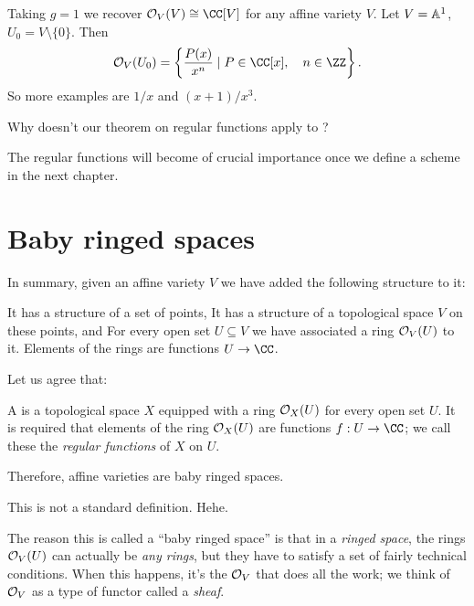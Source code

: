 \documentclass[11pt]{scrreprt}
\begin{document}
\begin{example}
	\listhack
	\begin{enumerate}[(a)]
		\ii Taking $g=1$ we recover $\OO_V(V) \cong \CC[V]$ for any affine variety $V$.
		\ii Let $V = \mathbb A^1$, $U_0 = V \setminus \{0\}$. Then
		\[ \OO_V(U_0)
			= \left\{ \frac{P(x)}{x^n} \mid P \in \CC[x], \quad n \in \ZZ \right\}. \]
		So more examples are $1/x$ and $(x+1)/x^3$.
	\end{enumerate}
\end{example}

\begin{ques}
	Why doesn't our theorem on regular functions apply to ?
\end{ques}

The regular functions will become of crucial importance
once we define a scheme in the next chapter.

\section{Baby ringed spaces}
In summary, given an affine variety $V$ we have
added the following structure to it:
\begin{itemize}
	\ii It has a structure of a set of points,
	\ii It has a structure of a topological space $V$ on these points, and
	\ii For every open set $U \subseteq V$
	we have associated a ring $\mathcal O_V(U)$ to it.
	Elements of the rings are functions $U \to \CC$.
\end{itemize}
Let us agree that:
\begin{definition}
	A  is a topological space $X$
	equipped with a ring $\mathcal O_X(U)$ for every open set $U$.
	It is required that elements of the ring $\mathcal O_X(U)$
	are functions $f : U \to \CC$;
	we call these the \emph{regular functions} of $X$ on $U$.
\end{definition}
Therefore, affine varieties are baby ringed spaces.
\begin{remark}
	This is not a standard definition. Hehe.
\end{remark}

The reason this is called a ``baby ringed space''
is that in a \emph{ringed space},
the rings $\mathcal O_V(U)$ can actually be \emph{any rings},
but they have to satisfy a set of fairly technical conditions.
When this happens, it's the $\mathcal O_V$ that does all the work;
we think of $\mathcal O_V$ as a type of functor called a \emph{sheaf}.
\end{document}

